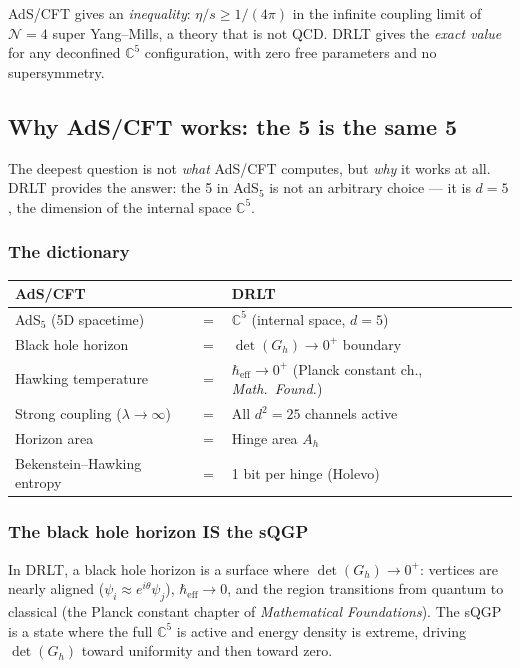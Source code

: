 \documentclass[12pt]{article}
\theoremstyle{remark}
\theoremstyle{definition}
\newcommand{\CC}{\mathbb{C}}
\begin{document}
AdS/CFT gives an \emph{inequality}: $\eta/s \geq 1/(4\pi)$ in the infinite coupling limit of $\mathcal{N} = 4$ super Yang--Mills, a theory that is not QCD. DRLT gives the \emph{exact value} for any deconfined $\CC^5$ configuration, with zero free parameters and no supersymmetry.

\subsection{Why AdS/CFT works: the 5 is the same 5}

The deepest question is not \emph{what} AdS/CFT computes, but \emph{why} it works at all. DRLT provides the answer: the 5 in AdS$_5$ is not an arbitrary choice --- it is $d = 5$, the dimension of the internal space $\CC^5$.

\subsubsection{The dictionary}

\begin{center}
\begin{tabular}{lcl}
\hline
AdS/CFT & & DRLT \\
\hline
AdS$_5$ (5D spacetime) & $=$ & $\CC^5$ (internal space, $d = 5$) \\
Black hole horizon & $=$ & $\det(G_h) \to 0^+$ boundary \\
Hawking temperature & $=$ & $\hbar_\text{eff} \to 0^+$ (Planck constant ch., \textit{Math.\ Found.}) \\
Strong coupling ($\lambda \to \infty$) & $=$ & All $d^2 = 25$ channels active \\
Horizon area & $=$ & Hinge area $A_h$ \\
Bekenstein--Hawking entropy & $=$ & 1 bit per hinge (Holevo) \\
\hline
\end{tabular}
\end{center}

\subsubsection{The black hole horizon IS the sQGP}

In DRLT, a black hole horizon is a surface where $\det(G_h) \to 0^+$: vertices are nearly aligned ($\psi_i \approx e^{i\theta}\psi_j$), $\hbar_\text{eff} \to 0$, and the region transitions from quantum to classical (the Planck constant chapter of \textit{Mathematical Foundations}). The sQGP is a state where the full $\CC^5$ is active and energy density is extreme, driving $\det(G_h)$ toward uniformity and then toward zero.
\end{document}
